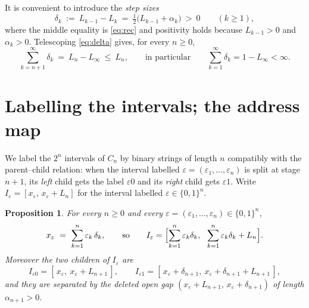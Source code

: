 \documentclass{amsart}
\newtheorem{proposition}{Proposition}
\theoremstyle{definition}
\theoremstyle{remark}
\begin{document}
It is convenient to introduce the \emph{step sizes}
\begin{equation}\label{eq:delta}
\delta_k\ :=\ L_{k-1}-L_k\ =\ \tfrac12\bigl(L_{k-1}+\alpha_k\bigr)\ >\ 0
\qquad(k\ge1),
\end{equation}
where the middle equality is \eqref{eq:rec} and positivity holds because
$L_{k-1}>0$ and $\alpha_k>0$. Telescoping \eqref{eq:delta} gives, for every
$n\ge0$,
\begin{equation}\label{eq:tail}
\sum_{k=n+1}^{\infty}\delta_k\ =\ L_n-L_\infty\ \le\ L_n,
\qquad\text{in particular}\qquad
\sum_{k=1}^{\infty}\delta_k=1-L_\infty<\infty .
\end{equation}

\section{Labelling the intervals; the address map}

We label the $2^n$ intervals of $C_n$ by binary strings of length $n$ compatibly
with the parent--child relation: when the interval labelled
$\varepsilon=(\varepsilon_1,\dots,\varepsilon_n)$ is split at stage $n+1$, its
\emph{left} child gets the label $\varepsilon0$ and its \emph{right} child gets
$\varepsilon1$. Write $I_\varepsilon=[x_\varepsilon,\,x_\varepsilon+L_n]$ for the
interval labelled $\varepsilon\in\{0,1\}^n$.

\begin{proposition}\label{prop:endpoint}
For every $n\ge0$ and every $\varepsilon=(\varepsilon_1,\dots,\varepsilon_n)\in\{0,1\}^n$,
\begin{equation}\label{eq:xeps}
x_\varepsilon\ =\ \sum_{k=1}^{n}\varepsilon_k\,\delta_k ,
\qquad\text{so}\qquad
I_\varepsilon=\Bigl[\sum_{k=1}^{n}\varepsilon_k\delta_k,\ \
\sum_{k=1}^{n}\varepsilon_k\delta_k+L_n\Bigr].
\end{equation}
Moreover the two children of $I_\varepsilon$ are
\begin{equation}\label{eq:children}
I_{\varepsilon0}=[\,x_\varepsilon,\ x_\varepsilon+L_{n+1}\,],
\qquad
I_{\varepsilon1}=[\,x_\varepsilon+\delta_{n+1},\ x_\varepsilon+\delta_{n+1}+L_{n+1}\,],
\end{equation}
and they are separated by the deleted open gap $(x_\varepsilon+L_{n+1},\,x_\varepsilon+\delta_{n+1})$ of length $\alpha_{n+1}>0$.
\end{proposition}
\end{document}
